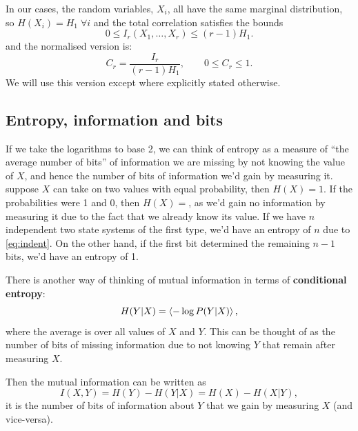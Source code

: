 \documentclass[12pt]{article}
\begin{document}
In our cases, the random variables, $X_i$, all have the same marginal distribution, so $H(X_i)=H_1\; \forall i$ and the total correlation satisfies the bounds
%
\begin{equation}\label{eq:mutinfbounds}
  0 \leq I_r(X_1,\ldots,X_r) \leq (r-1)H_1.
\end{equation}
%
and the normalised version is:
%
\begin{equation}\label{eq:normmutinf}
  C_r = \frac{I_r}{(r-1)H_1}, \qquad 0 \leq C_r \leq 1.
\end{equation}
%
We will use this version except where explicitly stated otherwise.

\subsection{Entropy, information and bits}\label{sec:bits}

If we take the logarithms to base 2, we can think of entropy as a measure of ``the average number of bits'' of information we are missing by not knowing the value of $X$, and hence the number of bits of information we'd gain by measuring it. \Eg suppose $X$ can take on two values with equal probability, then $H(X)=1$. If the probabilities were 1 and 0, then $H(X)=$, as we'd gain no information by measuring it due to the fact that we already know its value. If we have $n$ independent two state systems of the first type, we'd have an entropy of $n$ due to \eqref{eq:indent}. On the other hand, if the first bit determined the remaining $n-1$ bits, we'd have an entropy of 1.

There is another way of thinking of mutual information in terms of \textbf{conditional entropy}:
%
\begin{equation}\label{eq:condent}
  H(Y|X) = \left\langle -\log P(Y|X) \right\rangle,
\end{equation}
%
where the average is over all values of $X$ and $Y$. This can be thought of as the number of bits of missing information due to not knowing $Y$ that remain after measuring $X$.

Then the mutual information can be written as
%
\begin{equation}\label{eq:mutinfcond}
  I(X,Y) = H(Y) - H(Y|X) = H(X) - H(X|Y),
\end{equation}
%
\ie it is the number of bits of information about $Y$ that we gain by measuring $X$ (and vice-versa).
\end{document}
